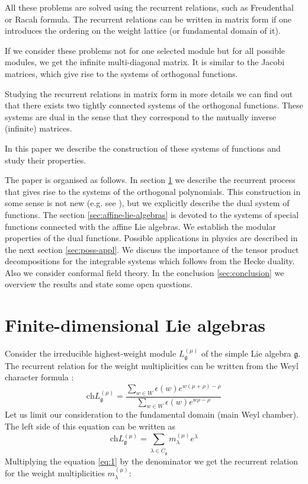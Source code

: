 \documentclass[a4paper,12pt]{article}
\theoremstyle{definition} \newtheorem{Def}{Definition}
\begin{document}
All these problems are solved using the recurrent relations, such as Freudenthal or Racah formula. 
The recurrent relations can be written in matrix form if one introduces the ordering on the weight lattice (or fundamental domain of it).

If we consider these problems not for one selected module but for all possible modules, we get the infinite multi-diagonal matrix. It is similar to the Jacobi matrices, which give rise to the systems of orthogonal functions.

Studying the recurrent relations in matrix form in more details we can find out that there exists two tightly connected systems of the orthogonal functions. These systems are dual in the sense that they correspond to the mutually inverse (infinite) matrices. 

In this paper we describe the construction of these systems of functions and study their properties. 

The paper is organised as follows. In section \ref{sec:finite-dimens-lie} we describe the recurrent process that gives rise to the systems of the orthogonal polynomials. This construction in some sense is not new (e.g. see \cite{2010arXiv1001.3683N}), but we explicitly describe the dual system of functions.  The section \ref{sec:affine-lie-algebras} is devoted to the systems of special functions connected with the affine Lie algebras. We establish the modular properties of the dual functions. Possible applications in physics are described in the next section \ref{sec:poss-appl}. We discuss the importance of the tensor product decompositions for the integrable systems which follows from the Hecke duality. Also we consider conformal field theory.
In the conclusion \ref{sec:conclusion} we overview the results and state some open questions.

\section{Finite-dimensional Lie algebras}
\label{sec:finite-dimens-lie}
Consider the irreducible highest-weight module $L^{(\mu)}_{\mathfrak{g}}$ of the simple Lie algebra $\mathfrak{g}$. 
The recurrent relation for the weight multiplicities can be written from the Weyl character formula \cite{lyakhovsky1996rra}:
\begin{equation}
  \label{eq:1}
  \mathrm{ch} L^{(\mu)}_{\mathfrak{g}}=\frac{\sum_{w\in W}\epsilon(w) e^{w(\mu+\rho)-\rho}}{\sum_{w\in W}\epsilon(w) e^{w \rho -\rho}}
\end{equation}
Let us limit our consideration to the fundamental domain (main Weyl chamber). The left side of this equation can be written as
\begin{equation}
  \label{eq:2}
   \mathrm{ch} L^{(\mu)}_{\mathfrak{g}}=\sum_{\lambda\in \bar{C}_{\mathfrak{g}}} m^{(\mu)}_{\lambda} e^{\lambda}
\end{equation}
Multiplying the equation \eqref{eq:1} by the denominator we get the recurrent relation for the weight multiplicities $m^{(\mu)}_{\lambda}$:
\begin{equation}
  \label{eq:3}
  
\end{equation}
\end{document}
